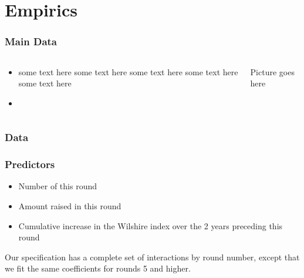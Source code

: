 \documentclass[12pt, aspectratio=169]{beamer}
\begin{document}

\section{Empirics}
\begin{frame}[label=data_slide]\frametitle{Main Data}

\begin{columns}
\begin{column}{0.6\textwidth}
\begin{itemize}
   \item some text here some text here some text here some text here some text here
   \item \hyperlink{appendix_end}{}
\end{itemize}
\end{column}
\begin{column}{0.4\textwidth}
    \begin{center}
    Picture goes here
     \end{center}
\end{column}
\end{columns}

\end{frame}


\begin{frame}
\frametitle{Data}

\centerline{
}

\end{frame}




\begin{frame}
\frametitle{Predictors}

\begin{itemize}
\item Number of this round
\item Amount raised in this round
\item Cumulative increase in the Wilshire index over the 2 years
preceding this round
\end{itemize}
\vspace{.5in}

Our specification has a complete set of
interactions by round number, except that we fit
the same coefficients for rounds 5 and higher.

\end{frame}
\end{document}
